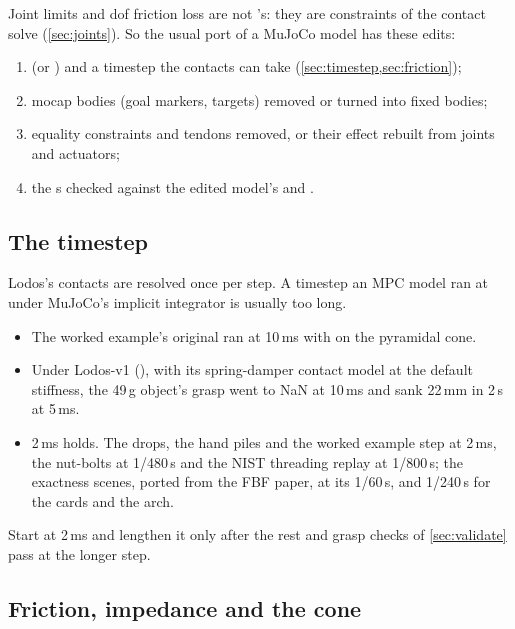 Joint limits and dof friction loss are not 's: they are constraints of the contact solve (\cref{sec:joints}). So the usual port of a MuJoCo model has these edits:

\begin{enumerate}
\item {} (or ) and a timestep the contacts can take (\cref{sec:timestep,sec:friction});
\item mocap bodies (goal markers, targets) removed or turned into fixed bodies;
\item equality constraints and tendons removed, or their effect rebuilt from joints and actuators;
\item the s checked against the edited model's  and .
\end{enumerate}

\subsection{The timestep}\label{sec:timestep}

Lodos's contacts are resolved once per step. A timestep an MPC model ran at under MuJoCo's implicit integrator is usually too long.

\begin{itemize}
\item The worked example's original ran at 10\,ms with  on the pyramidal cone.
\item Under Lodos-v1 (), with its spring-damper contact model at the default stiffness, the 49\,g object's grasp went to NaN at 10\,ms and sank 22\,mm in 2\,s at 5\,ms.
\item 2\,ms holds. The drops, the hand piles and the worked example step at 2\,ms, the nut-bolts at 1/480\,s and the NIST threading replay at 1/800\,s; the exactness scenes, ported from the FBF paper, at its 1/60\,s, and 1/240\,s for the cards and the arch.
\end{itemize}

Start at 2\,ms and lengthen it only after the rest and grasp checks of \cref{sec:validate} pass at the longer step.

\subsection{Friction, impedance and the cone}\label{sec:friction}

